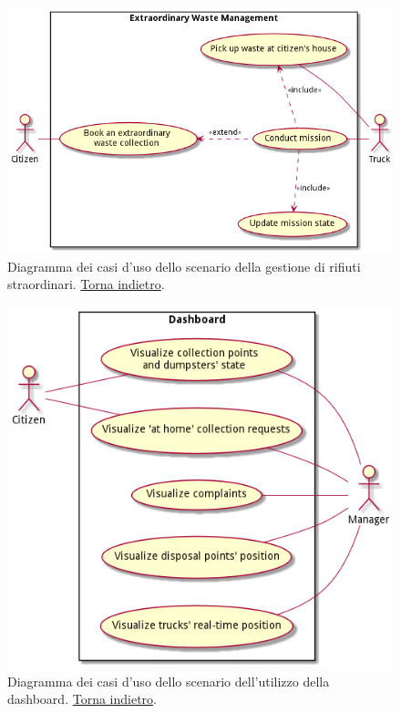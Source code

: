 \begin{figure}[H]
    \centering
    \includegraphics[width=\textwidth]{img/extraordinary-management-use-cases.pm}
    \caption{Diagramma dei casi d'uso dello scenario della gestione di rifiuti straordinari. \hyperlink{back:extraordinary-management-use-cases}{Torna indietro}.}
    \label{fig:extraordinary-management-use-cases}
\end{figure}

\begin{figure}[H]
    \centering
    \includegraphics[width=\textwidth]{img/dashboard-use-cases.pm}
    \caption{Diagramma dei casi d'uso dello scenario dell'utilizzo della dashboard. \hyperlink{back:dashboard-use-cases}{Torna indietro}.}
    \label{fig:dashboard-use-cases}
\end{figure}

